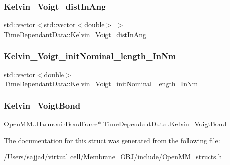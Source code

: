 \subsubsection{\texorpdfstring{Kelvin\_Voigt\_distInAng}{Kelvin\_Voigt\_distInAng}}
{\footnotesize\ttfamily std\+::vector$<$std\+::vector$<$double$>$ $>$ Time\+Dependant\+Data\+::\+Kelvin\+\_\+\+Voigt\+\_\+dist\+In\+Ang}

\mbox{\label{structTimeDependantData_ad3e49324aa777171e42e56281a100071}} 
\subsubsection{\texorpdfstring{Kelvin\_Voigt\_initNominal\_length\_InNm}{Kelvin\_Voigt\_initNominal\_length\_InNm}}
{\footnotesize\ttfamily std\+::vector$<$double$>$ Time\+Dependant\+Data\+::\+Kelvin\+\_\+\+Voigt\+\_\+init\+Nominal\+\_\+length\+\_\+\+In\+Nm}

\mbox{\label{structTimeDependantData_a534577fc9ff214a2c1fa07a7215db475}} 
\subsubsection{\texorpdfstring{Kelvin\_VoigtBond}{Kelvin\_VoigtBond}}
{\footnotesize\ttfamily Open\+M\+M\+::\+Harmonic\+Bond\+Force$\ast$ Time\+Dependant\+Data\+::\+Kelvin\+\_\+\+Voigt\+Bond}



The documentation for this struct was generated from the following file\+:\begin{DoxyCompactItemize}
\item 
/\+Users/sajjad/virtual cell/\+Membrane\+\_\+\+O\+B\+J/include/\mbox{\hyperlink{OpenMM__structs_8h}{Open\+M\+M\+\_\+structs.\+h}}\end{DoxyCompactItemize}
